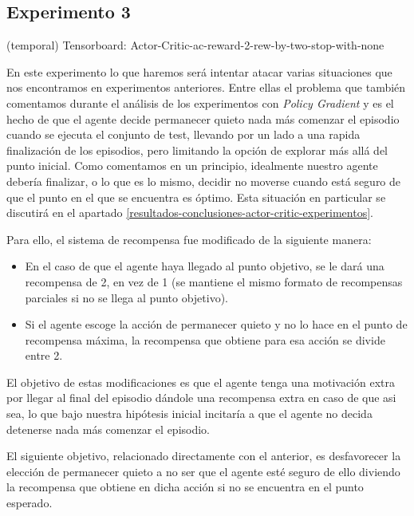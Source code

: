 \subsection{Experimento 3}
\label{resultados-actor-critic-experimento-3}

(temporal) Tensorboard: Actor-Critic-ac-reward-2-rew-by-two-stop-with-none

En este experimento lo que haremos será intentar atacar varias situaciones que nos encontramos en experimentos anteriores. Entre ellas el problema que también comentamos durante el análisis de los experimentos con \textit{Policy Gradient} y es el hecho de que el agente decide permanecer quieto nada más comenzar el episodio cuando se ejecuta el conjunto de test, llevando por un lado a una rapida finalización de los episodios, pero limitando la opción de explorar más allá del punto inicial. Como comentamos en un principio, idealmente nuestro agente debería finalizar, o lo que es lo mismo, decidir no moverse cuando está seguro de que el punto en el que se encuentra es óptimo. Esta situación en particular se discutirá en el apartado \ref{resultados-conclusiones-actor-critic-experimentos}.
\medskip

Para ello, el sistema de recompensa fue modificado de la siguiente manera:

\begin{itemize}
	\item En el caso de que el agente haya llegado al punto objetivo, se le dará una recompensa de 2, en vez de 1 (se mantiene el mismo formato de recompensas parciales si no se llega al punto objetivo).
	\item Si el agente escoge la acción de permanecer quieto y no lo hace en el punto de recompensa máxima, la recompensa que obtiene para esa acción se divide entre 2.
\end{itemize}
\medskip

El objetivo de estas modificaciones es que el agente tenga una motivación extra por llegar al final del episodio dándole una recompensa extra en caso de que asi sea, lo que bajo nuestra hipótesis inicial incitaría a que el agente no decida detenerse nada más comenzar el episodio.
\medskip

El siguiente objetivo, relacionado directamente con el anterior, es desfavorecer la elección de permanecer quieto a no ser que el agente esté seguro de ello diviendo la recompensa que obtiene en dicha acción si no se encuentra en el punto esperado.
\medskip

